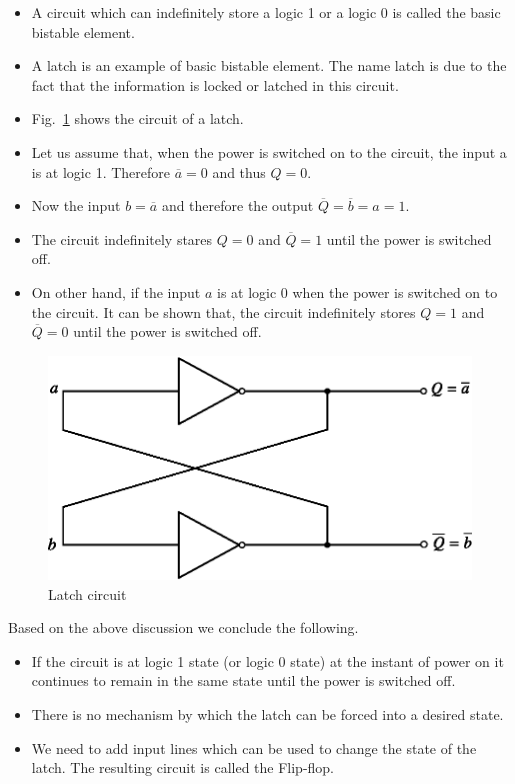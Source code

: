 \begin{itemize}
\item A circuit which can indefinitely store a logic 1 or a logic 0 is called the basic bistable element. 

\item A latch is an example of basic bistable element. The name latch is due to the fact that the information is locked or latched in this circuit.

\item Fig.~\ref{addfig6.37} shows the circuit of a latch.

\item Let us assume that, when the power is switched on to the circuit, the input a is at logic 1. Therefore $\overline{a}=0$ and thus $Q=0$.

\item Now the input $b=\overline{a}$ and therefore the output $\overline{Q}=\overline{b}=a=1$.

\item The circuit indefinitely stares $Q=0$ and $\overline{Q}=1$ until the power is switched off.

\item On other hand, if the input $a$ is at logic 0 when the power is switched on to the circuit. It can be shown that, the circuit indefinitely stores $Q=1$ and $\overline{Q}=0$ until the power is switched off.
\end{itemize}
\begin{figure}[H]
\centering
\includegraphics[scale=.95]{chap6/fig137a.eps}
\medskip
\caption{Latch circuit}\label{addfig6.37}
\end{figure}


Based on the above discussion we conclude the following.
\begin{itemize}
\item If the circuit is at logic 1 state (or logic 0 state) at the instant of power on it continues to remain in the same state until the power is switched off.

\item There is no mechanism by which the latch can be forced into a desired state.

\item We need to add input lines which can be used to change the state of the latch. The resulting circuit is called the Flip-flop.
\end{itemize}

